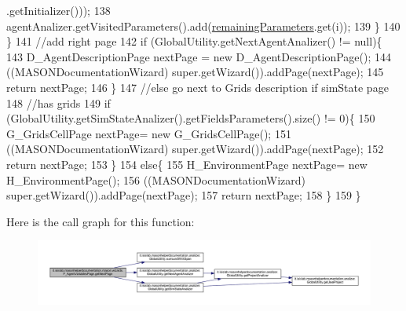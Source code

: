 \begin{DoxyCode}
      .getInitializer()));
138                 agentAnalizer.getVisitedParameters().add(\hyperlink{classit_1_1isislab_1_1masonhelperdocumentation_1_1mason_1_1wizards_1_1_f___agent_variables_page_ade36fab1c0254d3ac94c077a06fb75f2}{remainingParameters}.get(i));
139             \}
140         \}
141         \textcolor{comment}{//add right page}
142         \textcolor{keywordflow}{if} (GlobalUtility.getNextAgentAnalizer() != null)\{
143             D\_AgentDescriptionPage nextPage = \textcolor{keyword}{new} D\_AgentDescriptionPage();
144             ((MASONDocumentationWizard) super.getWizard()).addPage(nextPage);
145             \textcolor{keywordflow}{return} nextPage;
146         \}
147         \textcolor{comment}{//else go next to Grids description if simState page}
148         \textcolor{comment}{//has grids}
149         \textcolor{keywordflow}{if} (GlobalUtility.getSimStateAnalizer().getFieldsParameters().size() != 0)\{
150             G\_GridsCellPage nextPage= \textcolor{keyword}{new} G\_GridsCellPage();
151             ((MASONDocumentationWizard) super.getWizard()).addPage(nextPage); 
152             \textcolor{keywordflow}{return} nextPage; 
153         \}
154         \textcolor{keywordflow}{else}\{
155             H\_EnvironmentPage nextPage= \textcolor{keyword}{new} H\_EnvironmentPage();
156             ((MASONDocumentationWizard) super.getWizard()).addPage(nextPage); 
157             \textcolor{keywordflow}{return} nextPage; 
158         \}
159     \}
\end{DoxyCode}


Here is the call graph for this function\-:
\nopagebreak
\begin{figure}[H]
\begin{center}
\leavevmode
\includegraphics[width=350pt]{classit_1_1isislab_1_1masonhelperdocumentation_1_1mason_1_1wizards_1_1_f___agent_variables_page_adb2fda5d8a33bb1cb27eda1854c5a89b_cgraph}
\end{center}
\end{figure}


